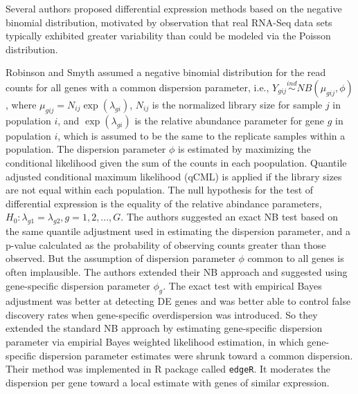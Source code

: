 Several authors proposed differential expression methods based on the negative binomial distribution, motivated by observation that real RNA-Seq data sets typically exhibited greater variability than could be modeled via the Poisson distribution\citep{lorenz2014using}. 

Robinson and Smyth \citep{robinson2007moderated} assumed a negative binomial distribution for the read counts for all genes with a common dispersion parameter, i.e., $Y_{gij} \stackrel{ind}{\sim} NB(\mu_{gij},\phi)$, where $\mu_{gij}=N_{ij}\exp(\lambda_{gi})$, $N_{ij}$ is the normalized library size for sample $j$ in population $i$, and $\exp(\lambda_{gi})$ is the relative abundance parameter for gene $g$ in population $i$, which is assumed to be the same to the replicate samples within a population. The dispersion parameter $\phi$ is estimated by maximizing the conditional likelihood given the sum of the counts in each poopulation. Quantile adjusted conditional maximum likelihood (qCML) is applied if the library sizes are not equal within each population. The null hypothesis for the test of differential expression is the equality of the relative abindance parameters, $H_0: \lambda_{g1} = \lambda_{g2}, g=1,2,...,G$. The authors suggested an exact NB test based on the same quantile adjustment used in estimating the dispersion parameter, and a p-value calculated as the probability of observing counts greater than those observed\citep{lorenz2014using}. But the assumption of dispersion parameter $\phi$ common to all genes is often implausible. The authors extended their NB approach and suggested using gene-specific dispersion parameter $\phi_g$\citep{robinson2007small}. The exact test with empirical Bayes adjustment was better at detecting DE genes and was better able to control false discovery rates when gene-specific overdispersion was introduced\citep{lorenz2014using}. So they extended the standard NB approach by estimating gene-specific dispersion parameter via empirial Bayes weighted likelihood estimation, in which gene-specific dispersion parameter estimates were shrunk toward a common dispersion. Their method was implemented in R package called {\tt edgeR}. It moderates the dispersion per gene toward a local estimate with genes of similar expression. 


